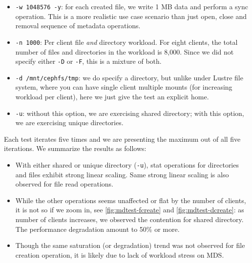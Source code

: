 \documentclass{article}
\begin{document}
\begin{itemize}
\item \verb!-w 1048576 -y!: for each created file, we write 1 MB data and
perform a sync operation.  This is a more realistic use case scenario than just
open, close and removal sequence of metadata operations.

\item \verb!-n 1000!: Per client file \textit{and} directory workload. For eight
clients, the total number of files and directories in the workload is 8,000. Since we did not specify
either \verb!-D! or \verb!-F!, this is a mixture of both.

\item \verb!-d /mnt/cephfs/tmp!: we do specify a directory, but unlike under
Lustre file system, where you can have single client multiple mounts (for
increasing workload per client), here we just give the test an explicit home.

\item \verb!-u!: without this option, we are exercising shared directory; with
this option, we are exercising unique directories.

\end{itemize}

Each test iterates five times and we are presenting the maximum out of all five iterations. 
We summarize the results as follows:


\begin{itemize}

\item With either shared or unique directory (\verb!-u!), stat
operations for directories and files exhibit strong linear scaling. Same strong
linear scaling is also observed for file read operations. 

\item While the other operations seems unaffected or flat by the number of
clients, it is not so if we zoom in, see \ref{fig:mdtest-fcreate} and
\ref{fig:mdtest-dcreate}:  as number of clients increases, we observed the
contention for shared directory. The performance degradation amount to 50\% or
more.

\item Though the same saturation (or degradation) trend was not observed for
file creation operation, it is likely due to lack of workload stress on MDS.

\end{itemize}
\end{document}
